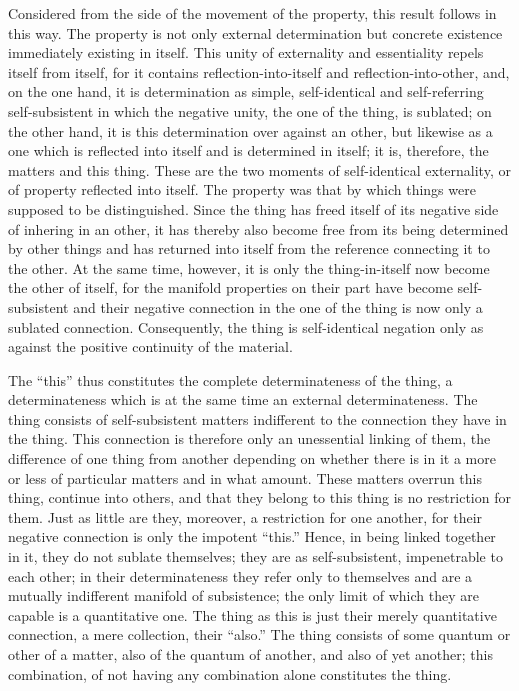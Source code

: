 Considered from the side of the movement of the property,
this result follows in this way.
The property is not only external determination but
concrete existence immediately existing in itself.
This unity of externality and essentiality repels itself from itself,
for it contains reflection-into-itself and reflection-into-other,
and, on the one hand, it is determination as simple,
self-identical and self-referring self-subsistent in which the negative unity,
the one of the thing, is sublated;
on the other hand, it is this determination over against an other,
but likewise as a one which is reflected into itself
and is determined in itself;
it is, therefore, the matters and this thing.
These are the two moments of self-identical externality,
or of property reflected into itself.
The property was that by which things were supposed to be distinguished.
Since the thing has freed itself of its negative side of inhering
in an other, it has thereby also become free from its being determined by
other things and has returned into itself from the reference connecting
it to the other.
At the same time, however, it is only the thing-in-itself
now become the other of itself,
for the manifold properties on their part have become self-subsistent
and their negative connection in the one of the thing is
now only a sublated connection.
Consequently, the thing is self-identical negation only as
against the positive continuity of the material.

The “this” thus constitutes the complete determinateness of the thing,
a determinateness which is at the same time an external determinateness.
The thing consists of self-subsistent matters indifferent to
the connection they have in the thing.
This connection is therefore only an unessential linking of them,
the difference of one thing from another depending on
whether there is in it a more or less of particular matters
and in what amount.
These matters overrun this thing, continue into others,
and that they belong to this thing is no restriction for them.
Just as little are they, moreover, a restriction for one another,
for their negative connection is only the impotent “this.”
Hence, in being linked together in it, they do not sublate themselves;
they are as self-subsistent, impenetrable to each other;
in their determinateness they refer only to themselves
and are a mutually indifferent manifold of subsistence;
the only limit of which they are capable is a quantitative one.
The thing as this is just their merely quantitative connection,
a mere collection, their “also.”
The thing consists of some quantum or other of a matter,
also of the quantum of another, and also of yet another;
this combination, of not having any combination alone constitutes the thing.

